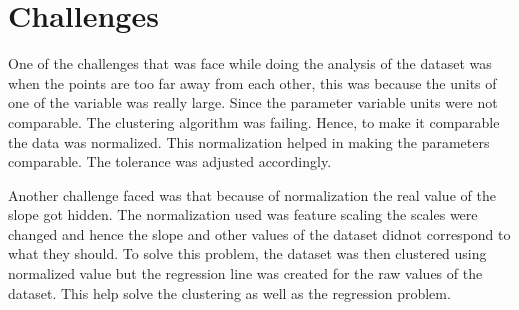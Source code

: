 \section{Challenges}

One of the challenges that was face while doing the analysis of the dataset was when the points are too far away from each other, this was because the units of one of the variable was really large. Since the parameter variable units were not comparable. The clustering algorithm was failing. Hence, to make it comparable the data was normalized. This normalization helped in making the parameters comparable. The tolerance was adjusted accordingly.

Another challenge faced was that because of normalization the real value of the slope got hidden. The normalization used was feature scaling the scales were changed and hence the slope and other values of the dataset didnot correspond to what they should. To solve this problem, the dataset was then clustered using normalized value but the regression line was created for the raw values of the dataset. This help solve the clustering as well as the regression problem.

